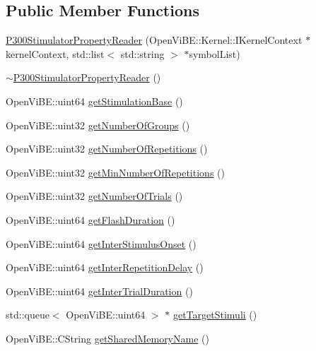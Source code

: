 \subsection*{Public Member Functions}
\begin{DoxyCompactItemize}
\item 
\hyperlink{classOpenViBEApplications_1_1P300StimulatorPropertyReader_af55a69f2a25ac99de5d1bb58eb66a501}{P300StimulatorPropertyReader} (OpenViBE::Kernel::IKernelContext $\ast$kernelContext, std::list$<$ std::string $>$ $\ast$symbolList)
\item 
\hyperlink{classOpenViBEApplications_1_1P300StimulatorPropertyReader_a0181388ed641afee644b62e67111b1f3}{$\sim$P300StimulatorPropertyReader} ()
\item 
OpenViBE::uint64 \hyperlink{classOpenViBEApplications_1_1P300StimulatorPropertyReader_a5ec330a1414eb8cac4b60f3373d9adec}{getStimulationBase} ()
\item 
OpenViBE::uint32 \hyperlink{classOpenViBEApplications_1_1P300StimulatorPropertyReader_a91255d93383e73da4c0e2f309381fa1c}{getNumberOfGroups} ()
\item 
OpenViBE::uint32 \hyperlink{classOpenViBEApplications_1_1P300StimulatorPropertyReader_a4777d799f34e2e4289af24fa791b1d32}{getNumberOfRepetitions} ()
\item 
OpenViBE::uint32 \hyperlink{classOpenViBEApplications_1_1P300StimulatorPropertyReader_a99bbefe812957497f17f58effc9336fe}{getMinNumberOfRepetitions} ()
\item 
OpenViBE::uint32 \hyperlink{classOpenViBEApplications_1_1P300StimulatorPropertyReader_a9a5a08e417cf1d77fc01ee1db6d067e5}{getNumberOfTrials} ()
\item 
OpenViBE::uint64 \hyperlink{classOpenViBEApplications_1_1P300StimulatorPropertyReader_aaa81dbb55603633bbfb993b5815e6dfd}{getFlashDuration} ()
\item 
OpenViBE::uint64 \hyperlink{classOpenViBEApplications_1_1P300StimulatorPropertyReader_a3d99b23a0497924dd5665399080c9c76}{getInterStimulusOnset} ()
\item 
OpenViBE::uint64 \hyperlink{classOpenViBEApplications_1_1P300StimulatorPropertyReader_ab2d32a65b1baa6bb3d59ee0427172c83}{getInterRepetitionDelay} ()
\item 
OpenViBE::uint64 \hyperlink{classOpenViBEApplications_1_1P300StimulatorPropertyReader_a6a64bceafc98f25907fb84b26fa8427d}{getInterTrialDuration} ()
\item 
std::queue$<$ OpenViBE::uint64 $>$ $\ast$ \hyperlink{classOpenViBEApplications_1_1P300StimulatorPropertyReader_a01f1e7833f9268cb2a8e7e1dc2ca789e}{getTargetStimuli} ()
\item 
OpenViBE::CString \hyperlink{classOpenViBEApplications_1_1P300StimulatorPropertyReader_a9f5e13b6e4db5682db1abc8a48659eb9}{getSharedMemoryName} ()
\end{DoxyCompactItemize}
